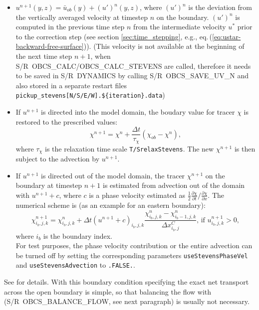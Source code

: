 \begin{itemize}
\item $u^{n+1}(y,z) = \bar{u}_{ob}(y) + (u')^{n}(y,z)$, where
  $(u')^{n}$ is the deviation from the vertically averaged velocity at
  timestep $n$ on the boundary. $(u')^{n}$ is computed in the previous
  time step $n$ from the intermediate velocity $u^*$ prior to the
  correction step (see section \ref{sec:time_stepping}, e.g.,
  eq.\,(\ref{eq:ustar-backward-free-surface})).
  (This velocity is not
  available at the beginning of the next time step $n+1$, when
  S/R~OBCS\_CALC/OBCS\_CALC\_STEVENS are called, therefore it needs to
  be saved in S/R~DYNAMICS by calling S/R~OBCS\_SAVE\_UV\_N and also
  stored in a separate restart files
  \verb+pickup_stevens[N/S/E/W].${iteration}.data+)
\item If $u^{n+1}$ is directed into the model domain, the boudary
  value for tracer $\chi$ is restored to the prescribed values:
  \[\chi^{n+1} =   \chi^{n} + \frac{\Delta{t}}{\tau_\chi} (\chi_{ob} -
  \chi^{n}),\] where $\tau_\chi$ is the relaxation time
  scale \texttt{T/SrelaxStevens}. The new $\chi^{n+1}$ is then subject
  to the advection by $u^{n+1}$.
\item If $u^{n+1}$ is directed out of the model domain, the tracer
  $\chi^{n+1}$ on the boundary at timestep $n+1$ is estimated from
  advection out of the domain with $u^{n+1}+c$, where $c$ is
  a phase velocity estimated as
  $\frac{1}{2}\frac{\partial\chi}{\partial{t}}/\frac{\partial\chi}{\partial{x}}$. The
  numerical scheme is (as an example for an eastern boundary):
  \[\chi_{i_{b},j,k}^{n+1} =   \chi_{i_{b},j,k}^{n} + \Delta{t} 
  (u^{n+1}+c)_{i_{b},j,k}\frac{\chi_{i_{b},j,k}^{n}
    - \chi_{i_{b}-1,j,k}^{n}}{\Delta{x}_{i_{b},j}^{C}}\mbox{, if }u_{i_{b},j,k}^{n+1}>0,
  \] where $i_{b}$ is the boundary index.\\
  For test purposes, the phase velocity contribution or the entire
  advection can be turned off by setting the corresponding parameters
  \texttt{useStevensPhaseVel} and \texttt{useStevensAdvection} to
  \texttt{.FALSE.}.
\end{itemize} 
See \citet{stevens:90} for details. With this boundary condition
specifying the exact net transport across the open boundary is simple,
so that balancing the flow with (S/R~OBCS\_BALANCE\_FLOW, see next
paragraph) is usually not necessary.

